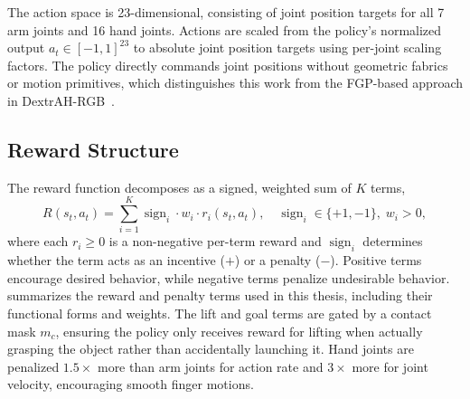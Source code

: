 The action space is 23-dimensional, consisting of joint position targets for all 7 arm joints and 16 hand joints.
Actions are scaled from the policy's normalized output $a_t \in [-1, 1]^{23}$ to absolute joint position targets using per-joint scaling factors.
The policy directly commands joint positions without geometric fabrics or motion primitives, which distinguishes this work from the FGP-based approach in DextrAH-RGB~\cite{Singh2025}.

\subsection{Reward Structure}%
\label{sec:reward_structure}%

The reward function decomposes as a signed, weighted sum of $K$ terms,
%
\begin{equation}\label{eq:reward}
    R(s_t, a_t) = \sum_{i=1}^{K} \operatorname{sign}_i \cdot w_i \cdot r_i(s_t, a_t), \quad \operatorname{sign}_i \in \{+1, -1\},\; w_i > 0,
\end{equation}
%
where each $r_i \geq 0$ is a non-negative per-term reward and $\operatorname{sign}_i$ determines whether the term acts as an incentive ($+$) or a penalty ($-$).
Positive terms encourage desired behavior, while negative terms penalize undesirable behavior.
 summarizes the reward and penalty terms used in this thesis, including their functional forms and weights.
The lift and goal terms are gated by a contact mask $m_c$, ensuring the policy only receives reward for lifting when actually grasping the object rather than accidentally launching it.
Hand joints are penalized $1.5\times$ more than arm joints for action rate and $3\times$ more for joint velocity, encouraging smooth finger motions.

